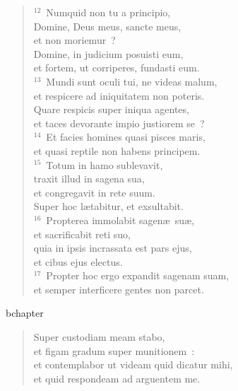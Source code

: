 \begin{verse}${}^{12}$~Numquid non tu a principio,\\ Domine, Deus meus, sancte meus,\\ et non moriemur~?\\ Domine, in judicium posuisti eum,\\ et fortem, ut corriperes, fundasti eum.\\
${}^{13}$~Mundi sunt oculi tui, ne videas malum,\\ et respicere ad iniquitatem non poteris.\\ Quare respicis super iniqua agentes,\\ et taces devorante impio justiorem se~?\\
${}^{14}$~Et facies homines quasi pisces maris,\\ et quasi reptile non habens principem.\\
${}^{15}$~Totum in hamo sublevavit,\\ traxit illud in sagena sua,\\ et congregavit in rete suum.\\ Super hoc l\ae tabitur, et exsultabit.\\
${}^{16}$~Propterea immolabit sagen\ae\ su\ae ,\\ et sacrificabit reti suo,\\ quia in ipsis incrassata est pars ejus,\\ et cibus ejus electus.\\
${}^{17}$~Propter hoc ergo expandit sagenam suam,\\ et semper interficere gentes non parcet.\end{verse}


bchapter\begin{verse}\vspace{-19pt}Super custodiam meam stabo,\\ et figam gradum super munitionem~:\\ et contemplabor ut videam quid dicatur mihi,\\ et quid respondeam ad arguentem me.\end{verse}


